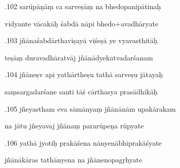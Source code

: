 \documentclass[article,12pt,a4paper]{memoir}%
\newcounter{parCount}
\begin{document}
	  
	  \pstart {}.102 sarūpāṇāṃ ca sarveṣāṃ na bhedopanipātinaḥ 
	{}
	\pend%
      

	  
	  \pstart \leavevmode%
	vidyante vācakāḥ śabdā nāpi bhedo+avadhāryate 
	{}
	\pend%
      

	  
	  \pstart {}.103 jñānaśabdārthaviṣayā viśeṣā ye vyavasthitāḥ 
	{}
	\pend%
      

	  
	  \pstart \leavevmode%
	teṣāṃ duravadhāratvāj jñānādyekatvadarśanam 
	{}
	\pend%
      

	  
	  \pstart {}.104 jñāneṣv api yathārtheṣu tathā sarveṣu jātayaḥ 
	{}
	\pend%
      

	  
	  \pstart \leavevmode%
	saṃsargadarśane santi tāś cārthasya prasādhikāḥ 
	{}
	\pend%
      

	  
	  \pstart {}.105 jñeyastham eva sāmānyaṃ jñānānām upakārakam 
	{}
	\pend%
      

	  
	  \pstart \leavevmode%
	na jātu jñeyavaj jñānaṃ pararūpeṇa rūpyate 
	{}
	\pend%
      

	  
	  \pstart {}.106 yathā jyotiḥ prakāśena nānyenābhiprakāśyate 
	{}
	\pend%
      

	  
	  \pstart \leavevmode%
	jñānākāras tathānyena na jñānenopagṛhyate 
	{}
	\pend%
      
\end{document}
